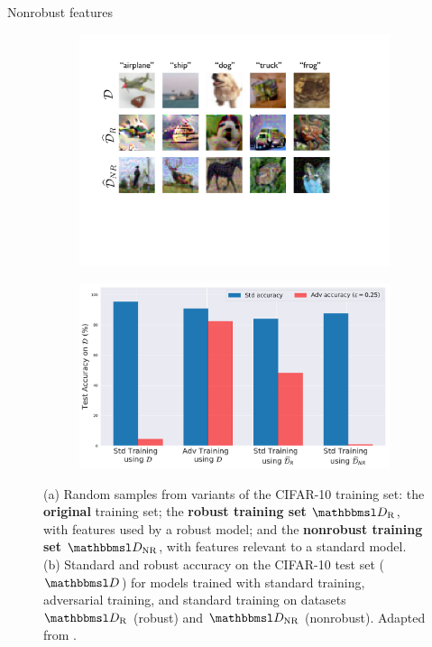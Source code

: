 \documentclass{beamer}
\newcommand{\citet}[1]{{\color{citecolor}\relscale{0.8}\textcite{#1}}}
\begin{document}
\begin{frame}[allowframebreaks=0.9]{Nonrobust features}
	\begin{figure}
		\centering
		\begin{subfigure}[b]{0.49\textwidth}
			\centering
			\includegraphics[width=1.0\textwidth]{figures/adversarial-examples/ilyas/cifar_datasets.pdf}
			\caption{}
			\label{fig:robust_inputs}
		\end{subfigure}
		\hfill
		\begin{subfigure}[b]{0.49\textwidth}
			\centering
			\includegraphics[width=\textwidth]{figures/adversarial-examples/ilyas/CIFAR_res.pdf}
			\caption{}
			\label{fig:robustify_cifar}
		\end{subfigure}
		\caption{
			(a) Random samples from variants of the
			CIFAR-10 training set:
			the \textbf{original} training set; 
			the \textbf{robust training set} $\set D_\text{R}$, with features used by a
			robust model; and
			the \textbf{nonrobust training set} $\set D_\text{NR}$, with
			features relevant to a standard model.
			(b) Standard and robust accuracy on the CIFAR-10
			test set ($\set D$) for models trained with standard training, adversarial training, and standard training on datasets $\set D_\text{R}$ (robust) and $\set D_\text{NR}$ (nonrobust). Adapted from \citet{Ilyas:2019:AENBTF}.}
		\label{fig:iliyas-experiment-results}
	\end{figure}
\end{frame}
\end{document}
